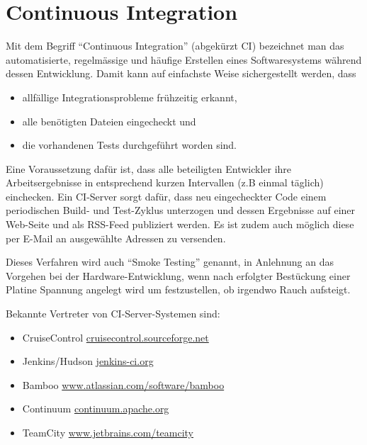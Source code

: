 \section{Continuous Integration}
Mit dem Begriff ``Continuous Integration'' (abgekürzt CI) bezeichnet man das
automatisierte, regelmässige und häufige Erstellen eines Softwaresystems während
dessen Entwicklung. Damit kann auf einfachste Weise sichergestellt
werden, dass
\begin{itemize}
\item allfällige Integrationsprobleme frühzeitig erkannt,
\item alle benötigten Dateien eingecheckt und
\item die vorhandenen Tests durchgeführt worden sind.
\end{itemize}
Eine Voraussetzung dafür ist, dass alle beteiligten
Entwickler ihre Arbeitsergebnisse in entsprechend kurzen Intervallen (z.B
einmal täglich) einchecken.
\newslide
Ein CI-Server sorgt dafür, dass neu eingecheckter Code einem
periodischen Build- und
Test-Zyklus unterzogen und dessen Ergebnisse auf einer Web-Seite und
als RSS-Feed publiziert werden.
Es ist zudem auch möglich diese per E-Mail an ausgewählte
Adressen zu versenden.

Dieses Verfahren wird auch ``Smoke Testing'' genannt, in
Anlehnung an das Vorgehen bei der Hardware-Entwicklung, wenn nach
erfolgter Bestückung einer Platine Spannung angelegt wird um
festzustellen, ob irgendwo Rauch aufsteigt.

\newslide
Bekannte Vertreter von CI-Server-Systemen sind:
\begin{itemize}
\item CruiseControl \href{http://cruisecontrol.sourceforge.net}
                        {cruisecontrol.sourceforge.net}
\item Jenkins/Hudson \href{http://jenkins-ci.org}{jenkins-ci.org}
\item Bamboo  \href{http://www.atlassian.com/software/bamboo}
     {www.atlassian.com/software/bamboo}
\item Continuum \href{http://continuum.apache.org}{continuum.apache.org}
\item TeamCity  \href{http://www.jetbrains.com/teamcity}
      {www.jetbrains.com/teamcity}
\end{itemize}
%
\newslide
